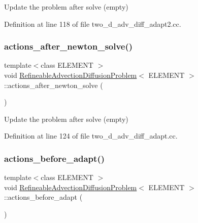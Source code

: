 Update the problem after solve (empty) 



Definition at line 118 of file two\+\_\+d\+\_\+adv\+\_\+diff\+\_\+adapt2.\+cc.

\mbox{\label{classRefineableAdvectionDiffusionProblem_a949296e60bc661fbd523974055a93f8b}} 
\subsubsection{\texorpdfstring{actions\+\_\+after\+\_\+newton\+\_\+solve()}{actions\_after\_newton\_solve()}\hspace{0.1cm}{\footnotesize\ttfamily [2/2]}}
{\footnotesize\ttfamily template$<$class E\+L\+E\+M\+E\+NT $>$ \\
void \hyperlink{classRefineableAdvectionDiffusionProblem}{Refineable\+Advection\+Diffusion\+Problem}$<$ E\+L\+E\+M\+E\+NT $>$\+::actions\+\_\+after\+\_\+newton\+\_\+solve (\begin{DoxyParamCaption}{ }\end{DoxyParamCaption})\hspace{0.3cm}{\ttfamily [inline]}}



Update the problem after solve (empty) 



Definition at line 124 of file two\+\_\+d\+\_\+adv\+\_\+diff\+\_\+adapt.\+cc.

\mbox{\label{classRefineableAdvectionDiffusionProblem_a3470a408c458e5500ac614b8f0e65634}} 
\subsubsection{\texorpdfstring{actions\+\_\+before\+\_\+adapt()}{actions\_before\_adapt()}}
{\footnotesize\ttfamily template$<$class E\+L\+E\+M\+E\+NT $>$ \\
void \hyperlink{classRefineableAdvectionDiffusionProblem}{Refineable\+Advection\+Diffusion\+Problem}$<$ E\+L\+E\+M\+E\+NT $>$\+::actions\+\_\+before\+\_\+adapt (\begin{DoxyParamCaption}{ }\end{DoxyParamCaption})\hspace{0.3cm}{\ttfamily [inline]}}



